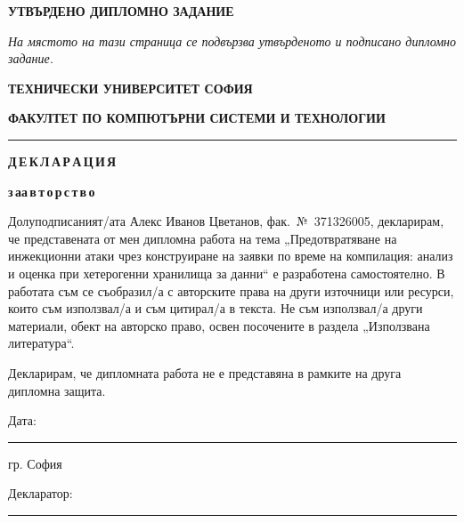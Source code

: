 \newpage
\pagestyle{empty}
\begin{center}
\vspace*{6cm}
{\fontsize{14}{16.8}\selectfont\bfseries УТВЪРДЕНО ДИПЛОМНО ЗАДАНИЕ\par}
\vspace{1cm}
{\itshape На мястото на тази страница се подвързва утвърденото и подписано
дипломно задание.\par}
\end{center}
\newpage
{\fontsize{14}{16.8}\selectfont
\begin{center}
    {\bfseries ТЕХНИЧЕСКИ УНИВЕРСИТЕТ \textendash{} СОФИЯ\par}
    \vspace{0.2cm}
    {\bfseries ФАКУЛТЕТ ПО КОМПЮТЪРНИ СИСТЕМИ И ТЕХНОЛОГИИ\par}
    \vspace{0.1cm}
    \rule{\linewidth}{0.8pt}
    \vspace{2.5cm}

    {\fontsize{18}{21.6}\selectfont\bfseries Д\,Е\,К\,Л\,А\,Р\,А\,Ц\,И\,Я\par}
    \vspace{0.3cm}
    {\bfseries з\,а\quad а\,в\,т\,о\,р\,с\,т\,в\,о\par}
\end{center}
\vspace{1cm}

Долуподписаният/ата Алекс Иванов Цветанов, фак.~№~371326005, декларирам, че
представената от мен дипломна работа на тема „Предотвратяване на инжекционни
атаки чрез конструиране на заявки по време на компилация: анализ и оценка при
хетерогенни хранилища за данни“ е разработена самостоятелно. В работата съм се
съобразил/а с авторските права на други източници или ресурси, които съм
използвал/а и съм цитирал/а в текста. Не съм използвал/а други материали, обект на
авторско право, освен посочените в раздела „Използвана литература“.

Декларирам, че дипломната работа не е представяна в рамките на друга дипломна
защита.

\vspace{3cm}
\noindent
\begin{minipage}[t]{0.45\linewidth}
Дата: \rule{4cm}{0.4pt}\par
\vspace{0.3cm}
гр. София
\end{minipage}\hfill
\begin{minipage}[t]{0.45\linewidth}
Декларатор: \rule{4.5cm}{0.4pt}
\end{minipage}
\par}
\newpage


